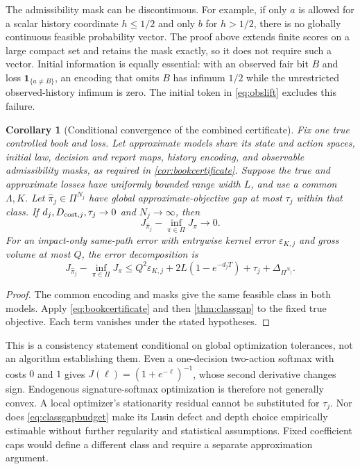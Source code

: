 \documentclass[11pt]{article}
\numberwithin{equation}{section}
\newtheorem{corollary}[theorem]{Corollary}
\theoremstyle{definition}
\theoremstyle{remark}
\theoremstyle{definition}
\begin{document}
The admissibility mask can be discontinuous. For example, if only $a$ is
allowed for a scalar history coordinate $h\le1/2$ and only $b$ for $h>1/2$,
there is no globally continuous feasible probability vector. The proof
above extends finite scores on a large compact set and retains the mask
exactly, so it does not require such a vector. Initial information is
equally essential: with an observed fair bit $B$ and loss
$\mathbf1_{\{a\ne B\}}$, an encoding that omits $B$ has infimum $1/2$
while the unrestricted observed-history infimum is zero. The initial token
in \eqref{eq:obslift} excludes this failure.

\begin{corollary}[Conditional convergence of the combined certificate]
\label{cor:convergence}
Fix one true controlled book and loss. Let approximate models share its
state and action spaces, initial law, decision and report maps, history
encoding, and observable admissibility masks, as required in
\cref{cor:bookcertificate}. Suppose the true and approximate losses have
uniformly bounded range width $L$, and use a common $\Lambda,K$.
Let $\widehat\pi_j\in\Pi^{N_j}$ have global approximate-objective gap at
most $\tau_j$ within that class. If
$d_j,D_{{\rm cost},j},\tau_j\to0$ and $N_j\to\infty$, then
\begin{equation}\label{eq:convergence}
 J_{\widehat\pi_j}-\inf_{\pi\in\Pi}J_\pi\longrightarrow0.
\end{equation}
For an impact-only same-path error with entrywise kernel error
$\varepsilon_{K,j}$ and gross volume at most $Q$, the error decomposition is
\begin{equation}\label{eq:convergencerate}
 J_{\widehat\pi_j}-\inf_{\pi\in\Pi}J_\pi
 \le Q^2\varepsilon_{K,j}+2L(1-e^{-d_jT})+\tau_j
                         +\Delta_{\Pi^{N_j}}.
\end{equation}
\end{corollary}
\begin{proof}
The common encoding and masks give the same feasible class in both models.
Apply \eqref{eq:bookcertificate} and then \cref{thm:classgap} to the fixed
true objective. Each term vanishes under the stated hypotheses.
\end{proof}

This is a consistency statement conditional on global optimization
tolerances, not an algorithm establishing them. Even a one-decision
two-action softmax with costs $0$ and $1$ gives
$J(\ell)=(1+e^{-\ell})^{-1}$, whose second derivative changes sign.
Endogenous signature-softmax optimization is therefore not generally
convex. A local optimizer's stationarity residual cannot be substituted for
$\tau_j$. Nor does \eqref{eq:classgapbudget} make its Lusin defect and
depth choice empirically estimable without further regularity and
statistical assumptions. Fixed coefficient caps would define a different
class and require a separate approximation argument.
\end{document}
